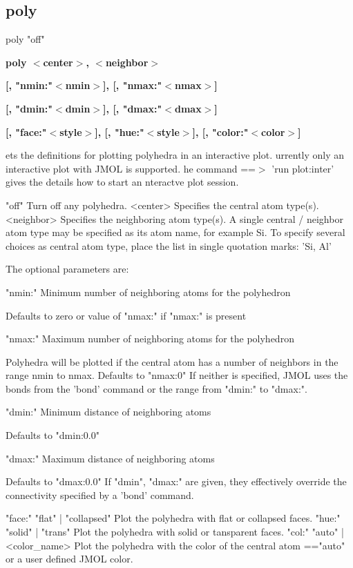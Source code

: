 \subsection*{poly}
\begin{MacVerbatim}
poly "off"
\end{MacVerbatim}
{\bf poly $ <$center$> $, $ <$neighbor$> $ \par }
{\bf      [, "nmin:"$ <$nmin$> $], [, "nmax:"$ <$nmax$> $] \par }
{\bf      [, "dmin:"$ <$dmin$> $], [, "dmax:"$ <$dmax$> $] \par }
{\bf      [, "face:"$ <$style$> $], [, "hue:"$ <$style$> $], [, "color:"$ <$color$> $] \par }
\par
\vspace{3pt}
ets the definitions for plotting polyhedra in an interactive plot. 
urrently only an interactive plot with JMOL is supported. 
he command ==$> $ 'run plot:inter' gives the details how to start an 
nteractve plot session. 
\par
\begin{MacVerbatim}
"off"      Turn off any polyhedra.
<center>   Specifies the central atom type(s).
<neighbor> Specifies the neighboring atom type(s).
         A single central / neighbor atom type may be specified
         as its atom name, for example Si.
         To specify several choices as central atom type, place
         the list in single quotation marks: 'Si, Al'
\end{MacVerbatim}
The optional parameters are: 
\par
\begin{MacVerbatim}
"nmin:"  Minimum number of neighboring atoms for the polyhedron
\end{MacVerbatim}
         Defaults to zero or value of "nmax:" if "nmax:" is present 
\begin{MacVerbatim}
"nmax:"  Maximum number of neighboring atoms for the polyhedron
\end{MacVerbatim}
         Polyhedra will be plotted if the central atom has a 
         number of neighbors in the range nmin to nmax. 
         Defaults to "nmax:0" 
         If neither is specified, JMOL uses the bonds from the 
         'bond' command or the range from "dmin:" to "dmax:". 
\begin{MacVerbatim}
"dmin:"  Minimum distance of neighboring atoms
\end{MacVerbatim}
         Defaults to "dmin:0.0" 
\begin{MacVerbatim}
"dmax:"  Maximum distance of neighboring atoms
\end{MacVerbatim}
         Defaults to "dmax:0.0" 
         If "dmin", "dmax:" are given, they effectively 
         override the connectivity specified by a 'bond' command. 
\begin{MacVerbatim}
"face:"  {"flat" | "collapsed"}
         Plot the polyhedra with flat or collapsed faces.
"hue:"   {"solid" | "trans"}
         Plot the polyhedra with solid or tansparent faces.
"col:"   {"auto" | <color_name>}
         Plot the polyhedra with the color of the central
         atom =="auto" or a user defined JMOL color.
\end{MacVerbatim}
